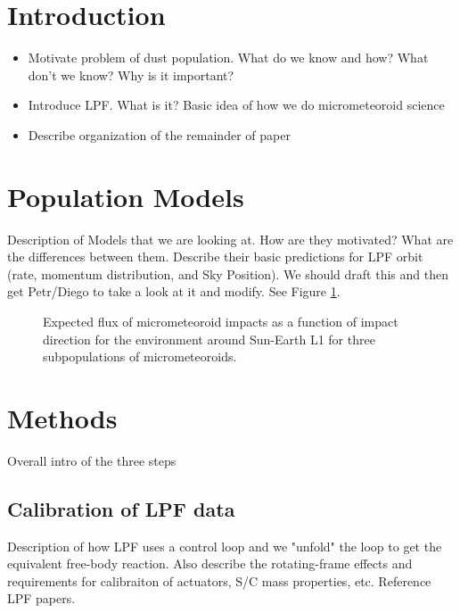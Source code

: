 \documentclass[preprint, trackchanges]{aastex61}
\begin{document}

\section{Introduction} \label{sec:intro}
\begin{itemize}
    \item Motivate problem of dust population. What do we know and how? What don't we know? Why is it important?
    \item Introduce LPF. What is it? Basic idea of how we do micrometeoroid science
    \item Describe organization of the remainder of paper
\end{itemize}
    
    


\section{Population Models}\label{sec:models}
Description of Models that we are looking at.  How are they motivated?  What are the differences between them. Describe their basic predictions for LPF orbit (rate, momentum distribution, and Sky Position). We should draft this and then get Petr/Diego to take a look at it and modify. See Figure \ref{fig:models}.

\begin{figure}
\caption{Expected flux of micrometeoroid impacts as a function of impact direction for the environment around Sun-Earth L1 for three subpopulations of micrometeoroids.\label{fig:models}}
\end{figure}

\section{Methods} \label{sec:methods}
Overall intro of the three steps
\subsection{Calibration of LPF data}\label{sec:calibration}
Description of how LPF uses a control loop and we "unfold" the loop to get the equivalent free-body reaction.  Also describe the rotating-frame effects and requirements for calibraiton of actuators, S/C mass properties, etc. Reference LPF papers. 
\end{document}
